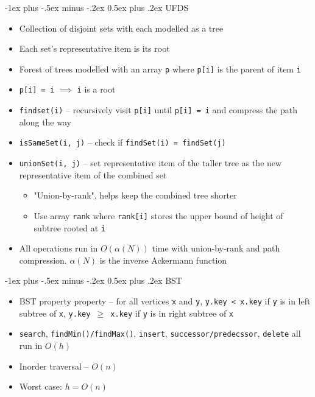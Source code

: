 \documentclass[10pt,landscape,a4paper]{article}
\makeatletter
\renewcommand{\section}{\@startsection{section}{1}{0mm}%
                                {-1ex plus -.5ex minus -.2ex}%
                                {0.5ex plus .2ex}%
                                {\normalfont\large\bfseries}}
\makeatother
\begin{document}
\begin{multicols}{4}
\section{UFDS}
\begin{itemize}
	\item Collection of disjoint sets with each modelled as a tree
	\item Each set's representative item is its root
	\item Forest of trees modelled with an array \texttt{p} where \texttt{p[i]} is the parent of item \texttt{i}
	\item \texttt{p[i] = i}  $\implies$ \texttt{i} is a root
	\item \texttt{findset(i)} -- recursively visit \texttt{p[i]} until \texttt{p[i] = i} and compress the path along the way
	\item \texttt{isSameSet(i, j)} -- check if \texttt{findSet(i) = findSet(j)} 
	\item \texttt{unionSet(i, j)} -- set representative item of the taller tree as the new representative item of the combined set
		\begin{itemize}
			\item "Union-by-rank", helps keep the combined tree shorter
			\item Use array \texttt{rank} where \texttt{rank[i]} stores the upper bound of height of subtree rooted at \texttt{i} 
		\end{itemize}
	\item All operations run in $O(\alpha(N))$ time with union-by-rank and path compression.  $\alpha(N)$ is the inverse Ackermann function
\end{itemize}
\section{BST}
\begin{itemize}
	\item BST property property -- for all vertices \texttt{x} and \texttt{y}, \texttt{y.key < x.key} if \texttt{y} is in left subtree of \texttt{x}, \texttt{y.key $\geq$ x.key} if \texttt{y} is in right subtree of \texttt{x} 
	\item \texttt{search}, \texttt{findMin()/findMax()}, \texttt{insert}, \texttt{successor/predecssor}, \texttt{delete} all run in $O(h)$ 
	\item Inorder traversal -- $O(n)$
	\item Worst case: $h=O(n)$
\end{itemize}

\end{multicols}
\end{document}
